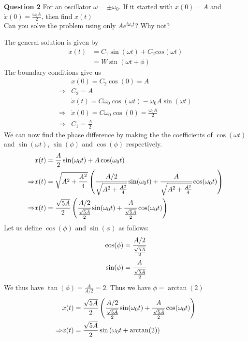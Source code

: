 \documentclass[addpoints]{exam}
\begin{document}
\begin{questions}
\question \textbf{ Question 2}
For an oscillator $\omega = \pm \omega_0$. If it started with $x(0)=A$ and $\Dot{x}(0) = \frac{\omega_0 A}{2}$, then find $x(t)$\\
Can you solve the problem using only $Ae^{i\omega_0 t}$? Why not?
\begin{solution}
 The general solution is given by 
 \begin{align*}
     x(t) &= C_1 \sin(\omega t ) + C_2 cos(\omega t)\\
     &= W\sin(\omega t +\phi)
 \end{align*}
 The boundary conditions give us 
 \begin{align*}
     & x(0) = C_2\cos(0) =A\\
     \Rightarrow & C_2=A \\
     &\Dot{x}(t) = C \omega_0 \cos(\omega t) - \omega_0 A \sin(\omega t)\\
     \Rightarrow &\Dot{x}(0) = C \omega_0 \cos(0) = \frac{\omega_0 A}{2}\\
     \Rightarrow &C_1 = \frac{A}{2}
 \end{align*}
 We can now find the phase difference by making the the coefficients of $\cos(\omega t)$ and $\sin(\omega t)$, $\sin(\phi)$ and $\cos(\phi)$ respectively.
 \begin{align*}
     &x(t) = \frac{A}{2}\sin(\omega_0 t) + A\cos(\omega_0 t)\\
     \Rightarrow & x(t) = \sqrt{A^2 + \frac{A^2}{4}} \left( \cfrac{A/2}{\sqrt{A^2 + \frac{A^2}{4}}}\sin(\omega_0 t) + \cfrac{A}{\sqrt{A^2 + \frac{A^2}{4}}}\cos(\omega_0 t)\right)\\
     \Rightarrow & x(t) = \frac{\sqrt{5A}}{2} \left( \cfrac{A/2}{\frac{\sqrt{5A}}{2}}\sin(\omega_0 t) + \cfrac{A}{\frac{\sqrt{5A}}{2}}\cos(\omega_0 t)\right)
 \end{align*}
 Let us define $\cos(\phi)$ and $\sin(\phi)$ as follows: 
 \begin{align*}
     \cos(\phi) &= \cfrac{A/2}{\frac{\sqrt{5A}}{2}}\\
     \sin(\phi) &= \cfrac{A}{\frac{\sqrt{5A}}{2}}
 \end{align*}
 We thus have $\tan (\phi) = \frac{A}{A/2} = 2$. Thus we have $\phi = \arctan(2)$
 \begin{align*}
     &x(t) = \frac{\sqrt{5A}}{2} \left( \cfrac{A/2}{\frac{\sqrt{5A}}{2}}\sin(\omega_0 t) + \cfrac{A}{\frac{\sqrt{5A}}{2}}\cos(\omega_0 t)\right)\\
     \Rightarrow & x(t) = \frac{\sqrt{5A}}{2}\sin\left(\omega_0t + \arctan(2)\right)

\end{align*}
\end{solution}
\end{questions}
\end{document}
